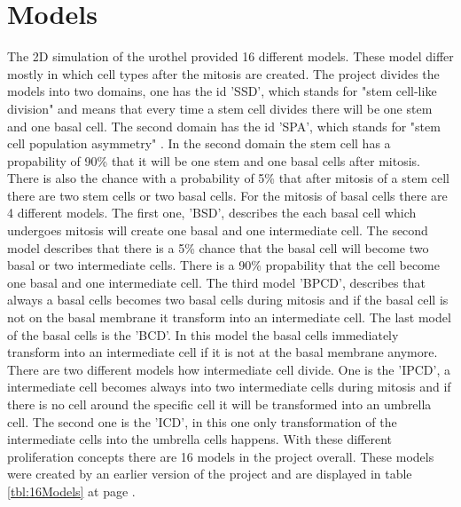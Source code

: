 \section{Models}
The 2D simulation of the urothel provided 16 different models. These model differ mostly in which cell types after the mitosis are created. The project divides the models into two domains, one has the id 'SSD', which stands for "stem cell-like division" \cite{Torelli2017} and means that every time a stem cell divides there will be one stem and one basal cell. The second domain has the id 'SPA', which stands for "stem cell population asymmetry" \cite{Torelli2017}. In the second domain the stem cell has a propability of 90\% that it will be one stem and one basal cells after mitosis. There is also the chance with a probability of 5\% that after mitosis of a stem cell there are two stem cells or two basal cells. \newline
For the mitosis of basal cells there are 4 different models. The first one, 'BSD', describes the each basal cell which undergoes mitosis will create one basal and one intermediate cell. The second model describes that there is a 5\% chance that the basal cell will become two basal or two intermediate cells. There is a 90\% propability that the cell become one basal and one intermediate cell. The third model 'BPCD', describes that always a basal cells becomes two basal cells during mitosis and if the basal cell is not on the basal membrane it transform into an intermediate cell. The last model of the basal cells is the 'BCD'. In this model the basal cells immediately transform into an intermediate cell if it is not at the basal membrane anymore.\newline
There are two different models how intermediate cell divide. One is the 'IPCD', a intermediate cell becomes always into two intermediate cells during mitosis and if there is no cell around the specific cell it will be transformed into an umbrella cell. The second one is the 'ICD', in this one only transformation of the intermediate cells into the umbrella cells happens. \newline
With these different proliferation concepts there are 16 models in the project overall. These models were created by an earlier version of the project \cite{Torellie2017} and are displayed in table \ref{tbl:16Models} at page \pageref{tbl:16Models}.


